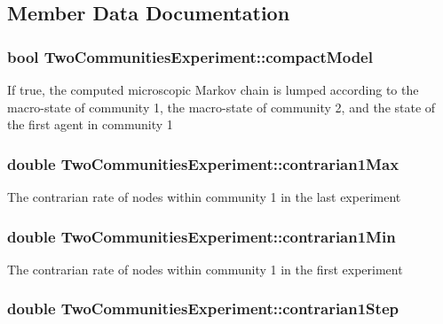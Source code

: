 \subsection{Member Data Documentation}
\hypertarget{class_two_communities_experiment_a4ed3dfc7aa3920dc9cf2eb3762e2c801}{
\subsubsection[{compact\-Model}]{\setlength{\rightskip}{0pt plus 5cm}bool Two\-Communities\-Experiment\-::compact\-Model}}\label{class_two_communities_experiment_a4ed3dfc7aa3920dc9cf2eb3762e2c801}
If true, the computed microscopic Markov chain is lumped according to the macro-\/state of community 1, the macro-\/state of community 2, and the state of the first agent in community 1 \hypertarget{class_two_communities_experiment_a4e41e8b55ad9be67dba9008f4caf9998}{
\subsubsection[{contrarian1\-Max}]{\setlength{\rightskip}{0pt plus 5cm}double Two\-Communities\-Experiment\-::contrarian1\-Max}}\label{class_two_communities_experiment_a4e41e8b55ad9be67dba9008f4caf9998}
The contrarian rate of nodes within community 1 in the last experiment \hypertarget{class_two_communities_experiment_ae135249e20a7ebd0483b3f02426a7772}{
\subsubsection[{contrarian1\-Min}]{\setlength{\rightskip}{0pt plus 5cm}double Two\-Communities\-Experiment\-::contrarian1\-Min}}\label{class_two_communities_experiment_ae135249e20a7ebd0483b3f02426a7772}
The contrarian rate of nodes within community 1 in the first experiment \hypertarget{class_two_communities_experiment_a6b7cedae14a26185c3e98ff22e02761f}{
\subsubsection[{contrarian1\-Step}]{\setlength{\rightskip}{0pt plus 5cm}double Two\-Communities\-Experiment\-::contrarian1\-Step}}\label{class_two_communities_experiment_a6b7cedae14a26185c3e98ff22e02761f}
